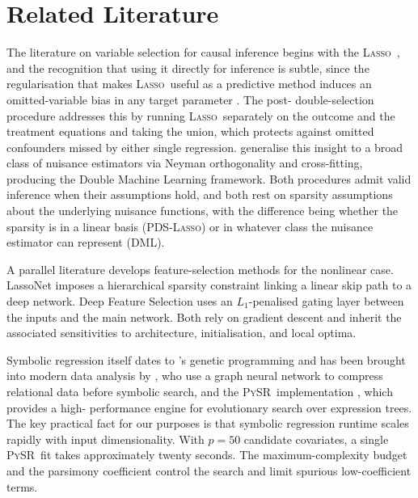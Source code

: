 \documentclass[11pt, a4paper]{article}
\theoremstyle{plain}
\theoremstyle{definition}
\theoremstyle{remark}
\newcommand{\lasso}{\textsc{Lasso}}
\newcommand{\pds}{\textsc{PDS}}
\newcommand{\dml}{\textsc{DML}}
\newcommand{\pysr}{\textsc{PySR}}
\begin{document}
\section{Related Literature}
\label{sec:lit}

The literature on variable selection for causal inference begins
with the \lasso\ \citep{tibshirani1996}, and the recognition that
using it directly for inference is subtle, since the
regularisation that makes \lasso\ useful as a predictive method
induces an omitted-variable bias in any target parameter \citep{bch2014}. The post-%
double-selection procedure addresses this by running \lasso\
separately on the outcome and the treatment equations and taking
the union, which protects against omitted confounders missed by
either single regression. \citet{chernozhukov2018} generalise this
insight to a broad class of nuisance estimators via Neyman
orthogonality and cross-fitting, producing the Double Machine
Learning framework. Both procedures admit valid inference when
their assumptions hold, and both rest on sparsity assumptions
about the underlying nuisance functions, with the difference
being whether the sparsity is in a linear basis (\pds-\lasso) or
in whatever class the nuisance estimator can represent (\dml).

A parallel literature develops feature-selection methods for the
nonlinear case. LassoNet \citep{lemhadri2021lassonet} imposes a
hierarchical sparsity constraint linking a linear skip path to a
deep network. Deep Feature Selection \citep{chen2021dfs} uses an
$L_1$-penalised gating layer between the inputs and the main
network. Both rely on gradient descent and inherit the associated
sensitivities to architecture, initialisation, and local optima.

Symbolic regression itself dates to \citet{koza1992}'s genetic
programming and has been brought into modern data analysis by
\citet{cranmer2020}, who use a graph neural network to compress
relational data before symbolic search, and the \pysr\
implementation \citep{cranmer2023pysr}, which provides a high-%
performance engine for evolutionary search over expression trees.
The key practical fact for our purposes is that symbolic
regression runtime scales rapidly with input dimensionality. With
$p=50$ candidate covariates, a single \pysr\ fit takes
approximately twenty seconds. The maximum-complexity budget and
the parsimony coefficient control the search and limit spurious
low-coefficient terms.
\end{document}
